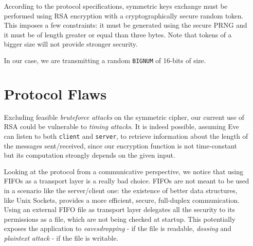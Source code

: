\documentclass[10pt,a4paper]{report}
\newcommand{\code}[1]{\texttt{#1}}
\begin{document}
According to the protocol specifications, symmetric keys exchange must be
performed using RSA encryption with a cryptographically secure random token.
This imposes a few constraints: it must be generated using the secure PRNG and
it must be of length greater or equal than three bytes.
Note that tokens of a bigger size will not provide stronger security.

In our case, we are transmitting a random \code{BIGNUM} of 16-bits of size.


\section{Protocol Flaws}

Excluding feasible \emph{bruteforce attacks} on the symmetric cipher, our current
use of RSA could be vulnerable to \emph{timing attacks}.
It is indeed possible, assuming Eve can listen to both \code{client} and
\code{server}, to retrieve information about the length of the messages
sent/received, since our encryption function is not time-constant but its
computation strongly depends on the given input.

Looking at the protocol from a communicative perspective, we notice that using
FIFOs as a transport layer is a really bad choice.
FIFOs are not meant to be used in a scenario like the server/client one: the
existence of better data structures, like Unix Sockets, provides a more
efficient, secure, full-duplex communication.
Using an external FIFO file as transport layer delegates all the security to its
permissions as a file, which are not being checked at startup.  This potentially
exposes the application to \emph{eavesdropping} - if the file is readable,
\emph{dossing} and \emph{plaintext attack} - if the file is writable.



\end{document}
